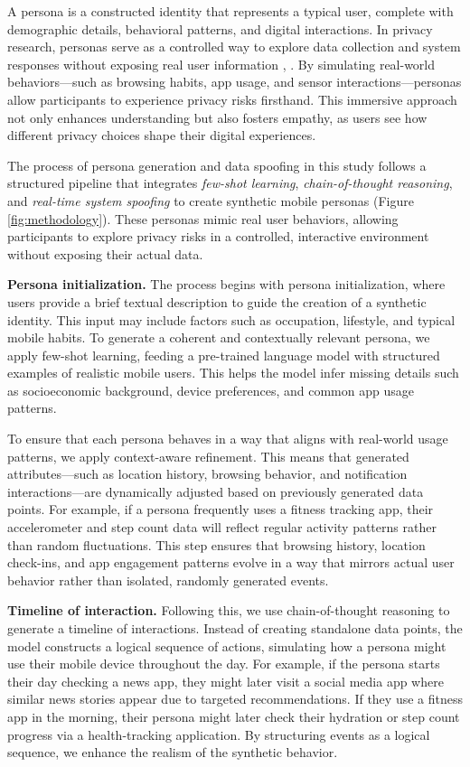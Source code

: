 \documentclass[acmlarge, nonacm]{acmart}
\begin{document}
A persona is a constructed identity that represents a typical user, complete with demographic details, behavioral patterns, and digital interactions. In privacy research, personas serve as a controlled way to explore data collection and system responses without exposing real user information \cite{persona}, \cite{Chaoran2023EmpathySandbox}. By simulating real-world behaviors—such as browsing habits, app usage, and sensor interactions—personas allow participants to experience privacy risks firsthand. This immersive approach not only enhances understanding but also fosters empathy, as users see how different privacy choices shape their digital experiences.

The process of persona generation and data spoofing in this study follows a structured pipeline that integrates \textit{few-shot learning}, \textit{chain-of-thought reasoning}, and \textit{real-time system spoofing} to create synthetic mobile personas (Figure \ref{fig:methodology}). These personas mimic real user behaviors, allowing participants to explore privacy risks in a controlled, interactive environment without exposing their actual data.

\textbf{Persona initialization.} The process begins with persona initialization, where users provide a brief textual description to guide the creation of a synthetic identity. This input may include factors such as occupation, lifestyle, and typical mobile habits. To generate a coherent and contextually relevant persona, we apply few-shot learning, feeding a pre-trained language model with structured examples of realistic mobile users. This helps the model infer missing details such as socioeconomic background, device preferences, and common app usage patterns.

To ensure that each persona behaves in a way that aligns with real-world usage patterns, we apply context-aware refinement. This means that generated attributes—such as location history, browsing behavior, and notification interactions—are dynamically adjusted based on previously generated data points. For example, if a persona frequently uses a fitness tracking app, their accelerometer and step count data will reflect regular activity patterns rather than random fluctuations. This step ensures that browsing history, location check-ins, and app engagement patterns evolve in a way that mirrors actual user behavior rather than isolated, randomly generated events.

\textbf{Timeline of interaction. }Following this, we use chain-of-thought reasoning to generate a timeline of interactions. Instead of creating standalone data points, the model constructs a logical sequence of actions, simulating how a persona might use their mobile device throughout the day. For example, if the persona starts their day checking a news app, they might later visit a social media app where similar news stories appear due to targeted recommendations. If they use a fitness app in the morning, their persona might later check their hydration or step count progress via a health-tracking application. By structuring events as a logical sequence, we enhance the realism of the synthetic behavior.
\end{document}
